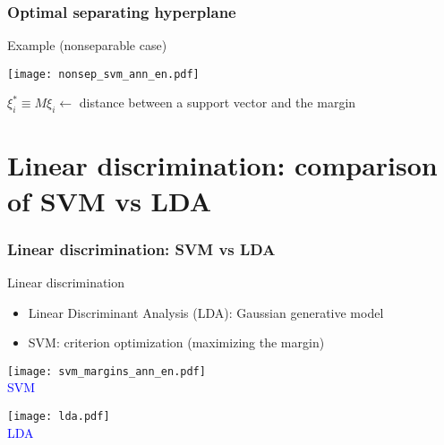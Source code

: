 \documentclass[compress, smaller, serif, 9pt]{beamer}
\begin{document}
\begin{frame}
   \frametitle{Optimal separating hyperplane}
    \begin{block}{Example (nonseparable case)}
    \end{block}
 \begin{minipage}{.65\textwidth}
     \begin{center}
      \texttt{[image: nonsep\_svm\_ann\_en.pdf]}
   \end{center}
 \end{minipage} \hfill
\begin{minipage}{.33\textwidth}
                 $\xi_i^* \equiv M \xi_i \leftarrow$ distance between a support vector and the margin
\end{minipage}


\end{frame}


\section{Linear discrimination: comparison of SVM vs LDA}

\begin{frame}
  \frametitle{Linear discrimination:  SVM vs LDA}
  \begin{block}{Linear discrimination}
   \begin{itemize}
    \item Linear Discriminant Analysis (LDA): Gaussian generative model
    \item SVM: criterion optimization (maximizing the margin)
   \end{itemize}
  \end{block}


\begin{minipage}{.48\textwidth}
\begin{center}
\texttt{[image: svm\_margins\_ann\_en.pdf]}\\
\textcolor{blue}{SVM}
\end{center}
\end{minipage}
\hfill
\begin{minipage}{.48\textwidth}
\begin{center}
\texttt{[image: lda.pdf]}\\
\textcolor{blue}{LDA}
\end{center}
\end{minipage}

\end{frame}
\end{document}
